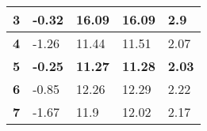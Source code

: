 \documentclass[10pt,a4paper]{article}
\begin{document}
\begin{table}[]
\begin{tabular}{|l|llll|}
\textbf{3}  & \multicolumn{1}{l|}{{\color[HTML]{333333} -0.32}}                                     & \multicolumn{1}{l|}{{\color[HTML]{333333} 16.09}}                                      & \multicolumn{1}{l|}{{\color[HTML]{333333} 16.09}}                                    & {\color[HTML]{333333} 2.9}                                                                       \\ \hline
\textbf{4}  & \multicolumn{1}{l|}{{\color[HTML]{333333} -1.26}}                                     & \multicolumn{1}{l|}{{\color[HTML]{333333} 11.44}}                                      & \multicolumn{1}{l|}{{\color[HTML]{333333} 11.51}}                                    & {\color[HTML]{333333} 2.07}                                                                      \\ \hline
\textbf{5}  & \multicolumn{1}{l|}{{\color[HTML]{32CB00} \textbf{-0.25}}}                            & \multicolumn{1}{l|}{{\color[HTML]{32CB00} \textbf{11.27}}}                             & \multicolumn{1}{l|}{{\color[HTML]{32CB00} \textbf{11.28}}}                           & {\color[HTML]{32CB00} \textbf{2.03}}                                                             \\ \hline
\textbf{6}  & \multicolumn{1}{l|}{{\color[HTML]{333333} -0.85}}                                     & \multicolumn{1}{l|}{{\color[HTML]{333333} 12.26}}                                      & \multicolumn{1}{l|}{{\color[HTML]{333333} 12.29}}                                    & {\color[HTML]{333333} 2.22}                                                                      \\ \hline
\textbf{7}  & \multicolumn{1}{l|}{{\color[HTML]{333333} -1.67}}                                     & \multicolumn{1}{l|}{{\color[HTML]{333333} 11.9}}                                       & \multicolumn{1}{l|}{{\color[HTML]{333333} 12.02}}                                    & {\color[HTML]{333333} 2.17}                                                                      \\ \hline
\end{tabular}
\end{table}
\end{document}
